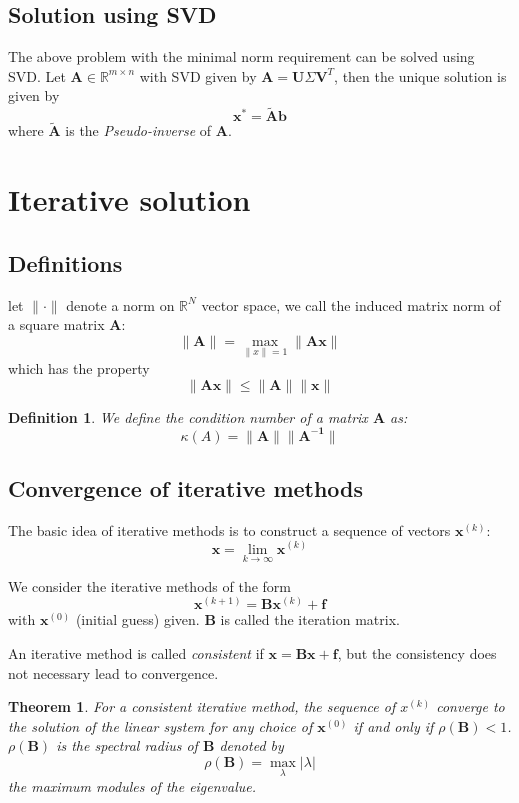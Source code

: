 \documentclass{article}
\newtheorem*{theorem}{Theorem}
\newtheorem*{definition}{Definition}
\begin{document}
\subsection{Solution using SVD}
The above problem with the minimal norm requirement can be solved using SVD.
Let $\mathbf{A}\in \mathbb{R}^{m\times n}$ with SVD given by 
$\mathbf{A} = \mathbf{U}\Sigma \mathbf{V}^T$, then the unique solution is 
given by
\[\mathbf{x}^* = \tilde{\mathbf{A}} \mathbf{b}\]
where $\tilde{\mathbf{A}}$ is the \emph{Pseudo-inverse} of $\mathbf{A}$.

\newpage
\section{Iterative solution}
\subsection{Definitions}
let $\|\cdot\|$ denote a norm on $\mathbb{R}^N$ vector space,
we call the induced matrix 
norm of a square matrix $\mathbf{A}$:
\begin{equation}
    \|\mathbf{A}\|=\max_{\|x\|=1} \|\mathbf{A}\mathbf{x}\|
\end{equation}
which has the property
\begin{equation}
    \|\mathbf{A}\mathbf{x}\| \leq \|\mathbf{A}\| \|\mathbf{x}\|
\end{equation}
\begin{definition}
    We define the condition number of a matrix $\mathbf{A}$ as:
    \[\kappa(A) = \|\mathbf{A}\| \|\mathbf{A^{-1}}\|\] 
\end{definition}

\subsection{Convergence of iterative methods}
The basic idea of iterative methods is to construct a sequence of vectors 
$\mathbf{x}^{(k)}$:
\[\mathbf{x} = \lim_{k\to \infty} \mathbf{x}^{(k)}\]

We consider the iterative methods of the form 
\[\mathbf{x}^{(k+1)} = \mathbf{B}\mathbf{x}^{(k)} + \mathbf{f}\]
with $\mathbf{x}^{(0)}$ (initial guess) given. $\mathbf{B}$ is called the iteration matrix.

An iterative method is called \emph{consistent} if 
$\mathbf{x} = \mathbf{B}\mathbf{x} + \mathbf{f}$, but the consistency does not necessary lead
to convergence. 
\begin{theorem}
    For a consistent iterative method, the sequence of $x^{(k)}$ converge to the solution 
    of the linear system for any choice of $\mathbf{x}^{(0)}$ if and only if 
    $\rho(\mathbf{B}) < 1$. $\rho(\mathbf{B})$ is the spectral radius of $\mathbf{B}$ 
    denoted by
    \[\rho(\mathbf{B}) = \max_{\lambda} |\lambda|\] 
    the maximum modules of the eigenvalue.
\end{theorem}
\end{document}
